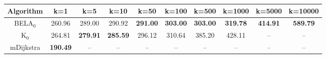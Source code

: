 \begin{tabular}{c|ccccccccc}\toprule
Algorithm & k=1 & k=5 & k=10 & k=50 & k=100 & k=500 & k=1000 & k=5000 & k=10000 \\ \midrule
BELA$_0$ & 260.96 & 289.00 & 290.92 & \textbf{291.00} & \textbf{303.00} & \textbf{303.00} & \textbf{319.78} & \textbf{414.91} & \textbf{589.79} \\
K$_0$ & 264.81 & \textbf{279.91} & \textbf{285.59} & 296.12 & 310.64 & 385.20 & 428.11 & -- & -- \\
mDijkstra & \textbf{190.49} & -- & -- & -- & -- & -- & -- & -- & -- \\ \bottomrule 
\end{tabular}
